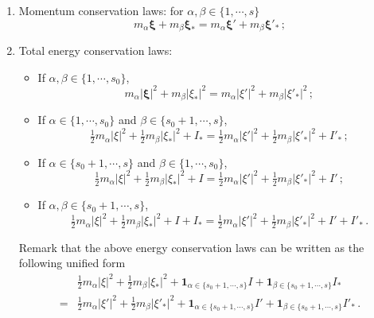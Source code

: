 \documentclass[reqno,11pt]{amsart}
\numberwithin{equation}{section}
\begin{document}
\begin{enumerate}
	\item Momentum conservation laws: for $\alpha, \beta \in \{ 1, \cdots, s \}$
	\begin{equation}\label{eq2.02}
		m_\alpha \mathbf{\xi } + m_\beta \mathbf{\xi }_* = m_\alpha \mathbf{\xi }' + m_\beta \mathbf{\xi }'_* \,;
	\end{equation}
    \item Total energy conservation laws:
    \begin{itemize}
    	\item If $ \alpha, \beta \in \{1, \cdots , s_0\}$,
    	\begin{equation}\label{eq2.03}
    		m_\alpha |\mathbf{\xi } |^2 + m_\beta |\xi_* |^2 = m_\alpha |\xi '|^2 +m_\beta |\xi '_*|^2 \,;
    	\end{equation}
        \item If $\alpha \in \{1, \cdots , s_0 \} $ and $\beta \in \{ s_0 + 1, \cdots , s \}$,
        \begin{equation}\label{eq2.04}
        	\tfrac{1}{2} m_\alpha |\xi |^2 + \tfrac{1}{2} m_\beta |\xi_* |^2 + I_* =\tfrac{1}{2} m_\alpha |\xi '|^2 + \tfrac{1}{2} m_\beta |\xi '_*|^2 +I'_* \,;
        \end{equation}
        \item If $\alpha \in \{ s_0 + 1, \cdots , s \} $ and $\beta \in \{ 1, \cdots , s_0 \} $,
        \begin{equation}\label{eq2.05}
        	\tfrac{1}{2} m_\alpha |\xi |^2 + \tfrac{1}{2} m_\beta |\xi_* |^2 + I =\tfrac{1}{2} m_\alpha |\xi '|^2 +\tfrac{1}{2} m_\beta |\xi '_*|^2 +I' \,;
        \end{equation}
        \item If $ \alpha , \beta \in \{ s_0 + 1, \cdots , s \} $,
        \begin{equation}
        	\tfrac{1}{2} m_\alpha |\xi |^2 + \tfrac{1}{2} m_\beta |\xi_* |^2 + I +I_* =\tfrac{1}{2} m_\alpha |\xi '|^2 +\tfrac{1}{2} m_\beta |\xi '_*|^2 +I' +I'_* \,.
        \end{equation}
    \end{itemize}
    Remark that the above energy conservation laws can be written as the following unified form
    \begin{equation}\label{eq2.06}
        \begin{aligned}
            & \tfrac{1}{2} m_\alpha |\xi |^2 + \tfrac{1}{2} m_\beta |\xi_* |^2 + \mathbf{1}_{ \alpha \in \{ s_0 + 1, \cdots, s \} } I + \mathbf{1}_{ \beta \in \{ s_0 + 1, \cdots, s \} }  I_*\\
            = & \tfrac{1}{2} m_\alpha |\xi '|^2 +\tfrac{1}{2} m_\beta |\xi '_*|^2 + \mathbf{1}_{ \alpha \in \{ s_0 + 1, \cdots, s \} } I' + \mathbf{1}_{ \beta \in \{ s_0 + 1, \cdots, s \} } I'_* \,.
        \end{aligned}
    \end{equation}
\end{enumerate}
\end{document}
